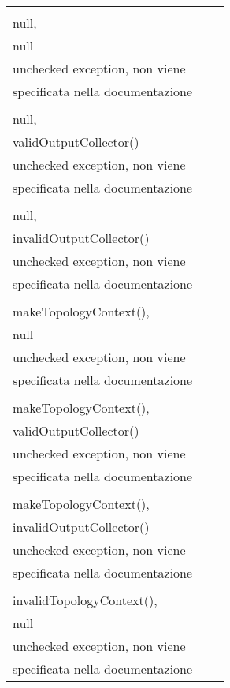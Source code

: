 \documentclass[10pt, a4paper]{article}
\newcommand{\Intmaketable}[4]{
	\begin{longtable}{#3}
	#4
	\caption{#2}
	\label{#1}
	\end{longtable}
}
\newcommand{\Inttestctable}[3]{
	\Intmaketable{#1}{#2}{|l|l|l|}{
	\hline
	\thead{Input} & \thead{Esito atteso} & \thead{Motivazione}\\
	\hline
	\hline
	#3
	\hline}
}
\newcommand{\Inttestccaption}[4]{Casi di test per metodo #1 di #2, iter. #3 (#4)}
\newcommand{\gettablelabel}[5]{table:#1:#2:#3:iter#4:proj#5}
\newcommand{\testctable}[5]{
	\Inttestctable{\gettablelabel{testc}{#1}{#2}{#3}{#4}}
		{\Inttestccaption{#1}{#2}{#3}{#4}}
		{#5}
}
\newcommand{\tcell}{\makecell[tl]}
\newcommand{\newtrow}{\\ \hline}
\def\storm{Storm}
\begin{document}
	\testctable{prepare}{WindowedBoltExecutor}{1}{\storm}{
			\tcell{null,\\null,\\null} &
			\tcell{RuntimeException viene lanciata} &
			\tcell{Ci si può aspettare una\\ unchecked exception, non viene\\ specificata nella documentazione}
		\newtrow
			\tcell{null,\\null,\\validOutputCollector()} &
			\tcell{RuntimeException viene lanciata} &
			\tcell{Ci si può aspettare una\\ unchecked exception, non viene\\ specificata nella documentazione}
		\newtrow
			\tcell{null,\\null,\\invalidOutputCollector()} &
			\tcell{RuntimeException viene lanciata} &
			\tcell{Ci si può aspettare una\\ unchecked exception, non viene\\ specificata nella documentazione}
		\newtrow
			\tcell{null,\\makeTopologyContext(),\\null} &
			\tcell{RuntimeException viene lanciata} &
			\tcell{Ci si può aspettare una\\ unchecked exception, non viene\\ specificata nella documentazione}
		\newtrow
			\tcell{null,\\makeTopologyContext(),\\validOutputCollector()} &
			\tcell{RuntimeException viene lanciata} &
			\tcell{Ci si può aspettare una\\ unchecked exception, non viene\\ specificata nella documentazione}
		\newtrow
			\tcell{null,\\makeTopologyContext(),\\invalidOutputCollector()} &
			\tcell{RuntimeException viene lanciata} &
			\tcell{Ci si può aspettare una\\ unchecked exception, non viene\\ specificata nella documentazione}
		\newtrow
			\tcell{null,\\invalidTopologyContext(),\\null} &
			\tcell{RuntimeException viene lanciata} &
			\tcell{Ci si può aspettare una\\ unchecked exception, non viene\\ specificata nella documentazione}
}
\end{document}
